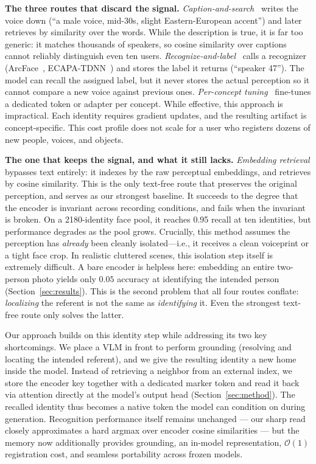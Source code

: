 \textbf{The three routes that discard the signal.} \emph{Caption-and-search}~\citep{mem0,memllm} writes the voice down (``a male voice, mid-30s, slight Eastern-European accent'') and later retrieves by similarity over the words. While the description is true, it is far too generic: it matches thousands of speakers, so cosine similarity over captions cannot reliably distinguish even ten users. \emph{Recognize-and-label}~\citep{m3agent} calls a recognizer (ArcFace~\citep{arcface}, ECAPA-TDNN~\citep{ecapa}) and stores the label it returns (``speaker 47''). The model can recall the assigned label, but it never stores the actual perception so it cannot compare a new voice against previous ones. \emph{Per-concept tuning}~\citep{yollava,myvlm} fine-tunes a dedicated token or adapter per concept. While effective, this approach is impractical. Each identity requires gradient updates, and the resulting artifact is concept-specific. This cost profile does not scale for a user who registers dozens of new people, voices, and objects.

\textbf{The one that keeps the signal, and what it still lacks.} \emph{Embedding retrieval} bypasses text entirely: it indexes by the raw perceptual embeddings, and retrieves by cosine similarity. This is the only text-free route that preserves the original perception, and serves as our strongest baseline. It succeeds to the degree that the encoder is invariant across recording conditions, and fails when the invariant is broken. On a 2180-identity face pool, it reaches 0.95 recall at ten identities, but performance degrades as the pool grows. Crucially, this method assumes the perception has \emph{already} been cleanly isolated---i.e., it receives a clean voiceprint or a tight face crop. In realistic cluttered scenes, this isolation step itself is extremely difficult. A bare encoder is helpless here: embedding an entire two-person photo yields only $0.05$ accuracy at identifying the intended person (Section~\ref{sec:results}). This is the second problem that all four routes conflate: \emph{localizing} the referent is not the same as \emph{identifying} it. Even the strongest text-free route only solves the latter.

Our approach builds on this identity step while addressing its two key shortcomings. We place a VLM in front to perform grounding (resolving and locating the intended referent), and we give the resulting identity a new home inside the model. Instead of retrieving a neighbor from an external index, we store the encoder key together with a dedicated marker token and read it back via attention directly at the model's output head (Section~\ref{sec:method}). The recalled identity thus becomes a native token the model can condition on during generation. Recognition performance itself remains unchanged --- our sharp read closely approximates a hard argmax over encoder cosine similarities --- but the memory now additionally provides grounding, an in-model representation, $\mathcal{O}(1)$ registration cost, and seamless portability across frozen models.



